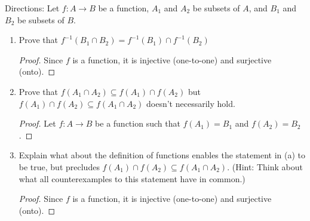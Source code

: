 \documentclass{article}
\begin{document}
Directions: Let $f:A\to B$ be a function, $A_1$ and $A_2$ be subsets of $A$, and $B_1$ and $B_2$ be subsets of $B$.

\begin{enumerate}
    \item Prove that $f^{-1}(B_1\cap B_2)=f^{-1}(B_1)\cap f^{-1}(B_2)$
    \begin{proof}
        Since $f$ is a function, it is injective (one-to-one) and surjective (onto).
    \end{proof}
    \item Prove that $f(A_1\cap A_2)\subseteq f(A_1)\cap f(A_2)$ but $f(A_1)\cap f(A_2)\subseteq f(A_1\cap A_2)$ doesn't necessarily hold.
    \begin{proof}
        Let $f:A\to B$ be a function such that $f(A_1)=B_1$ and $f(A_2)=B_2$.
    \end{proof}
    \item Explain what about the definition of functions enables the statement in (a) to be true, but precludes $f(A_1)\cap f(A_2)\subseteq f(A_1\cap A_2)$. (Hint: Think about what all counterexamples to this statement have in common.)
    \begin{proof}
        Since $f$ is a function, it is injective (one-to-one) and surjective (onto).
    \end{proof}
\end{enumerate}
\end{document}
